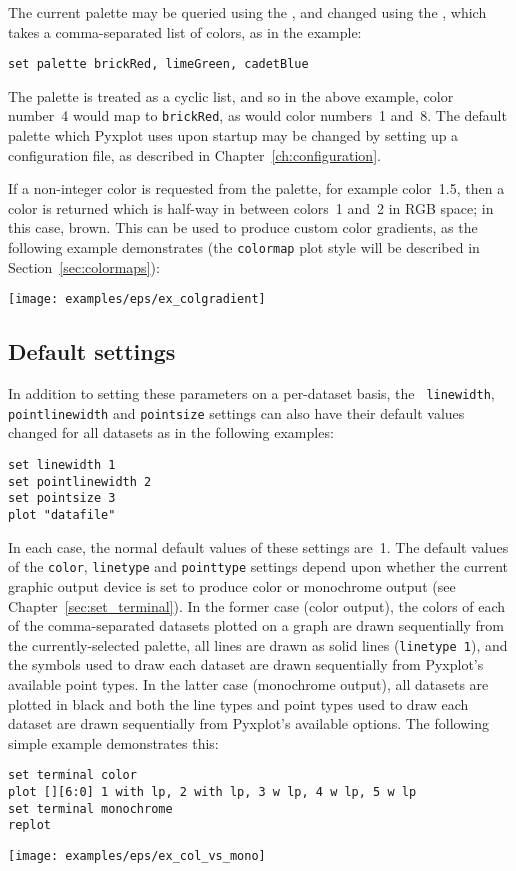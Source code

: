 The current palette may be queried using the , and
changed using the , which takes a comma-separated list of
colors, as in the example:

\begin{verbatim}
set palette brickRed, limeGreen, cadetBlue
\end{verbatim}

\noindent The palette is treated as a cyclic list, and so in the above example,
color number~4 would map to {\tt brickRed}, as would color numbers~1 and~8. The
default palette which Pyxplot uses upon startup may be changed by setting up a
configuration file, as described in Chapter~\ref{ch:configuration}.

If a non-integer color is requested from the palette, for example color~1.5,
then a color is returned which is half-way in between colors~1 and~2 in RGB
space; in this case, brown. This can be used to produce custom color gradients,
as the following example demonstrates (the {\tt colormap} plot style will be
described in Section~\ref{sec:colormaps}):

\vspace{2mm}

\vspace{2mm}

\centerline{\texttt{[image: examples/eps/ex\_colgradient]}}


\subsection{Default settings}

In addition to setting these parameters on a per-dataset basis, the {\tt
linewidth}, {\tt pointlinewidth} and {\tt pointsize} settings can also have
their default values changed for all datasets as in the following examples:
\begin{verbatim}
set linewidth 1
set pointlinewidth 2
set pointsize 3
plot "datafile"
\end{verbatim}
In each case, the normal default values of these settings are~1. The default
values of the {\tt color}, {\tt linetype} and {\tt pointtype} settings depend
upon whether the current graphic output device is set to produce color or
monochrome output (see Chapter~\ref{sec:set_terminal}). In the former case
(color output), the colors of each of the comma-separated datasets plotted on
a graph are drawn sequentially from the currently-selected palette, all lines
are drawn as solid lines ({\tt line\-type~1}), and the symbols used to draw
each dataset are drawn sequentially from Pyxplot's available point types. In
the latter case (monochrome output), all datasets are plotted in black and
both the line types and point types used to draw each dataset are drawn
sequentially from Pyxplot's available options. The following simple example
demonstrates this:
\begin{verbatim}
set terminal color
plot [][6:0] 1 with lp, 2 with lp, 3 w lp, 4 w lp, 5 w lp
set terminal monochrome
replot
\end{verbatim}
\centerline{\texttt{[image: examples/eps/ex\_col\_vs\_mono]}}

